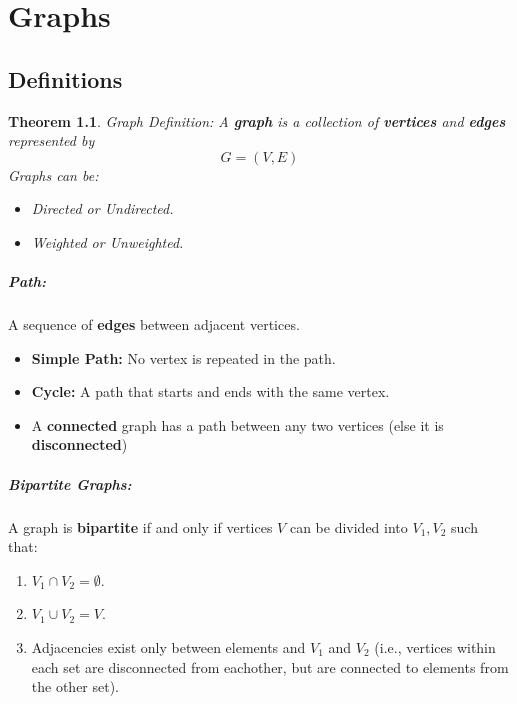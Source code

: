 \documentclass[a4paper,12pt]{report}
\newtheorem{theorem}{Theorem}
\begin{document}
\chapter{Graphs}

\section{Definitions}

\begin{theorem}{Graph Definition:}
A \textbf{graph} is a collection of \textbf{vertices} and \textbf{edges} represented by 
\begin{equation}
G = (V,E)
\end{equation}
Graphs can be:
\begin{itemize}
\item Directed or Undirected.
\item Weighted or Unweighted.
\end{itemize}

\end{theorem}


\paragraph{Path: } A sequence of \textbf{edges} between adjacent vertices. 
\begin{itemize}
\item \textbf{Simple Path: } No vertex is repeated in the path.
\item \textbf{Cycle: } A path that starts and ends with the same vertex.
\item A \textbf{connected} graph has a path between any two vertices (else it is \textbf{disconnected})
\end{itemize}


\paragraph{Bipartite Graphs: } A graph is \textbf{bipartite} if and only if vertices $V$ can be divided into $V_1, V_2$ such that:
\begin{enumerate}
\item $V_1 \cap V_2 = \emptyset$.
\item $V_1 \cup V_2 = V$.
\item Adjacencies exist only between elements and $V_1$ and $V_2$ (i.e., vertices within each set are disconnected from eachother, but are connected to elements from the other set).
\end{enumerate}
\end{document}
